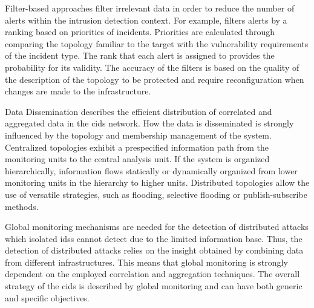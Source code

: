 Filter-based approaches filter irrelevant data in order to reduce the number of alerts within the intrusion detection context. For example, \cite{goo_2002} filters alerts by a ranking based on priorities of incidents. Priorities are calculated through comparing the topology familiar to the target with the vulnerability requirements of the incident type. The rank that each alert is assigned to provides the probability for its validity. The accuracy of the filters is based on the quality of the description of the topology to be protected and require reconfiguration when changes are made to the infrastructure.

Data Dissemination describes the efficient distribution of correlated and aggregated data in the \gls{cids} network. How the data is disseminated is strongly influenced by the topology and membership management of the system. Centralized topologies exhibit a prespecified information path from the monitoring units to the central analysis unit. If the system is organized hierarchically, information flows statically or dynamically organized from lower monitoring units in the hierarchy to higher units. Distributed topologies allow the use of versatile strategies, such as flooding, selective flooding or publish-subscribe methods.

Global monitoring mechanisms are needed for the detection of distributed attacks which isolated \glspl{ids} cannot detect due to the limited information base. Thus, the detection of distributed attacks relies on the insight obtained by combining data from different infrastructures. This means that global monitoring is strongly dependent on the employed correlation and aggregation techniques. The overall strategy of the \gls{cids} is described by global monitoring and can have both generic and specific objectives. 